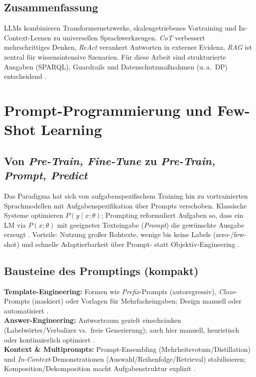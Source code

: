 \subsection{Zusammenfassung}
LLMs kombinieren Transformernetzwerke, skalengetriebenes Vortraining und In-Context-Lernen zu universellen Sprachwerkzeugen. \emph{CoT} verbessert mehrschrittiges Denken, \emph{ReAct} verankert Antworten in externer Evidenz, \emph{RAG} ist zentral für wissensintensive Szenarien. Für diese Arbeit sind strukturierte Ausgaben (SPARQL), Guardrails und Datenschutzmaßnahmen (u.\,a.\ DP) entscheidend \cite{vaswani2017attention,brown2020language,wei2022chain,yao2023react,ouyang2022training,lewis2020rag,holtzman2020curious,abadi2016deep,carlini2021extracting,dubey2019lcquad2,cong2023schema}.









\section{Prompt-Programmierung und Few-Shot Learning}
\label{sec:prompting}

\subsection{Von \emph{Pre-Train, Fine-Tune} zu \emph{Pre-Train, Prompt, Predict}}
Das Paradigma hat sich von aufgabenspezifischem Training hin zu vortrainierten Sprachmodellen mit Aufgabenspezifikation über Prompts verschoben. Klassische Systeme optimieren $P(y\mid x;\theta)$; Prompting reformuliert Aufgaben so, dass ein LM via $P(x;\theta)$ mit geeigneter Texteingabe (\emph{Prompt}) die gewünschte Ausgabe erzeugt \cite{liu2023survey}. Vorteile: Nutzung großer Rohtexte, wenige bis keine Labels (zero-/few-shot) und schnelle Adaptierbarkeit über Prompt- statt Objektiv-Engineering \cite{liu2023survey}.

\subsection{Bausteine des Promptings (kompakt)}
\textbf{Template-Engineering:} Formen wie \emph{Prefix}-Prompts (autoregressiv), \emph{Cloze}-Prompts (maskiert) oder Vorlagen für Mehrfacheingaben; Design manuell oder automatisiert \cite{liu2023survey}.\\
\textbf{Answer-Engineering:} Antwortraum gezielt einschränken (Labelwörter/Verbalizer vs.\ freie Generierung); auch hier manuell, heuristisch oder kontinuierlich optimiert \cite{liu2023survey}.\\
\textbf{Kontext \& Multiprompts:} Prompt-Ensembling (Mehrheitsvotum/Distillation) und \emph{In-Context}-Demonstrationen (Auswahl/Reihenfolge/Retrieval) stabilisieren; Komposition/Dekomposition macht Aufgabenstruktur explizit \cite{liu2023survey}.

